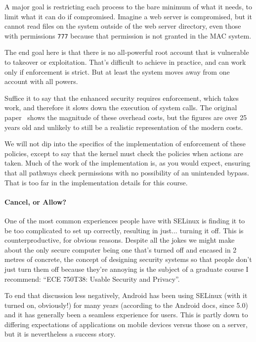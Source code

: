 A major goal is restricting each process to the bare minimum of what it needs, to limit what it can do if compromised. Imagine a web server is compromised, but it cannot read files on the system outside of the web server directory, even those with permissions \texttt{777} because that permission is not granted in the MAC system.

The end goal here is that there is no all-powerful root account that is vulnerable to takeover or exploitation. That's difficult to achieve in practice, and can work only if enforcement is strict. But at least the system moves away from one account with all powers.

Suffice it to say that the enhanced security requires enforcement, which takes work, and therefore it slows down the execution of system calls. The original paper~\cite{270995} shows the magnitude of these overhead costs, but the figures are over 25 years old and unlikely to still be a realistic representation of the modern costs. 

We will not dip into the specifics of the implementation of enforcement of these policies, except to say that the kernel must check the policies when actions are taken. Much of the work of the implementation is, as you would expect, ensuring that all pathways check permissions with no possibility of an unintended bypass. That is too far in the implementation details for this course. 

\paragraph{Cancel, or Allow?} One of the most common experiences people have with SELinux is finding it to be too complicated to set up correctly, resulting in just... turning it off. This is counterproductive, for obvious reasons. Despite all the jokes we might make about the only secure computer being one that's turned off and encased in 2 metres of concrete, the concept of designing security systems so that people don't just turn them off because they're annoying is the subject of a graduate course I recommend: ``ECE 750T38: Usable Security and Privacy''.

To end that discussion less negatively, Android has been using SELinux (with it turned on, obviously!) for many years (according to the Android docs, since 5.0) and it has generally been a seamless experience for users. This is partly down to differing expectations of applications on mobile devices versus those on a server, but it is nevertheless a success story.

